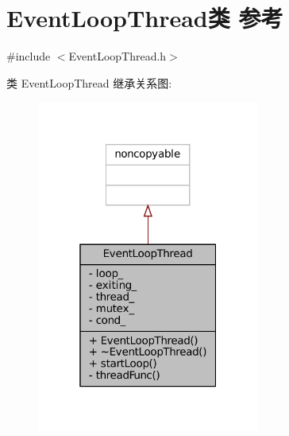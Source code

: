 \hypertarget{classmuduo_1_1EventLoopThread}{}\section{Event\+Loop\+Thread类 参考}
\label{classmuduo_1_1EventLoopThread}


{\ttfamily \#include $<$Event\+Loop\+Thread.\+h$>$}



类 Event\+Loop\+Thread 继承关系图\+:
\nopagebreak
\begin{figure}[H]
\begin{center}
\leavevmode
\includegraphics[width=208pt]{classmuduo_1_1EventLoopThread__inherit__graph}
\end{center}
\end{figure}


